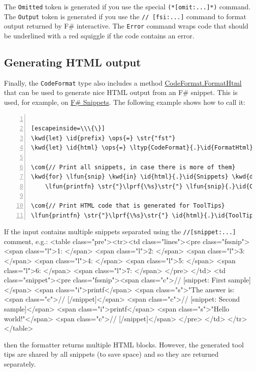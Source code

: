 \documentclass{article}
\newcommand{\id}[1]{\textcolor{black}{#1}}
\newcommand{\com}[1]{\textcolor{officegreen}{#1}}
\newcommand{\kwd}[1]{\textcolor{navy}{#1}}
\newcommand{\ops}[1]{\textcolor{purple}{#1}}
\newcommand{\str}[1]{\textcolor{olive}{#1}}
\begin{document}
The \texttt{Omitted} token is generated if you use the special \texttt{(*[omit:...]*)} command.
The \texttt{Output} token is generated if you use the \texttt{// [fsi:...]} command to format
output returned by F\# interactive. The \texttt{Error} command wraps code that should be
underlined with a red squiggle if the code contains an error.
\subsection*{Generating HTML output}



Finally, the \texttt{CodeFormat} type also includes a method \href{https://fsprojects.github.io/FSharp.Formatting/reference/fsharp-formatting-codeformat-codeformat.html}{CodeFormat.FormatHtml} that can be used
to generate nice HTML output from an F\# snippet. This is used, for example, on
\href{http://www.fssnip.net}{F\# Snippets}. The following example shows how to call it:
\begin{lstlisting}[numbers=left]

[escapeinside=\\\{\}]
\kwd{let} \id{prefix} \ops{=} \str{"fst"}
\kwd{let} \id{html} \ops{=} \ltyp{CodeFormat}{.}\id{FormatHtml}{(}\id{snippets}{,} \id{prefix}{)}

\com{// Print all snippets, in case there is more of them}
\kwd{for} \lfun{snip} \kwd{in} \id{html}{.}\id{Snippets} \kwd{do}
    \lfun{printfn} \str{"}\lprf{\%s}\str{"} \lfun{snip}{.}\id{Content}

\com{// Print HTML code that is generated for ToolTips}
\lfun{printfn} \str{"}\lprf{\%s}\str{"} \id{html}{.}\id{ToolTip}

\end{lstlisting}



If the input contains multiple snippets separated using the \texttt{//[snippet:...]} comment, e.g.:
<table class="pre"><tr><td class="lines"><pre class="fssnip">
<span class="l">1: </span>
<span class="l">2: </span>
<span class="l">3: </span>
<span class="l">4: </span>
<span class="l">5: </span>
<span class="l">6: </span>
<span class="l">7: </span>
</pre>
</td>
<td class="snippet"><pre class="fssnip"><span class="c">// [snippet: First sample]</span>
<span class="i">printf</span> <span class="s">"The answer is: %
<span class="c">// [/snippet]</span>
<span class="c">// [snippet: Second sample]</span>
<span class="i">printf</span> <span class="s">"Hello world!"</span>
<span class="c">// [/snippet]</span>
</pre>
</td>
</tr>
</table>


then the formatter returns multiple HTML blocks. However, the generated tool tips
are shared by all snippets (to save space) and so they are returned separately.
\end{document}
